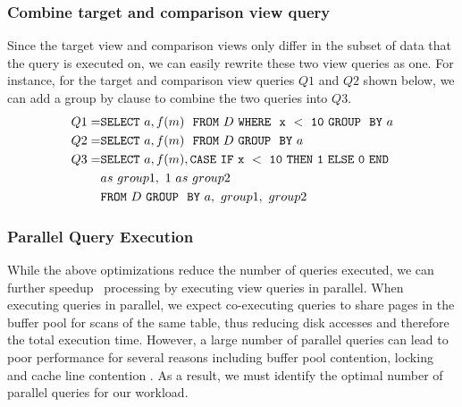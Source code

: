 \subsubsection{Combine target and comparison view query}
\label{subsec:target_comparison_view}
Since the target view and comparison views only differ in the subset of data
that the query is executed on, we can easily rewrite these two view queries as
one. For instance, for the target and comparison view queries $Q1$ and $Q2$
shown below, we can add a group by clause to combine the two queries into $Q3$.
\begin{align*} 
Q1 = &{\tt SELECT \ } a, f(m) \ \ {\tt FROM} \  D\  {\tt WHERE \ \ x\ <\ 10\
GROUP \ \ BY} \ a \\
Q2 = &{\tt SELECT \ } a, f(m) \ \ {\tt FROM} \  D\  {\tt GROUP \ \ BY} \ a \\
Q3 = &{\tt SELECT \ } a, f(m), {\tt CASE\ IF\ x\ <\ 10\ THEN\ 1\ ELSE\ 0\
END}\\ 
&as\ group1,\ 1\ as\ group2\\ 
&{\tt FROM} \ D\ {\tt GROUP \ \ BY} \ a,\ group1,\ group2
\end{align*}

  \subsubsection {Parallel Query Execution}
  \label{subsec:parallel_exec}
  While the above optimizations reduce the number of queries executed, we can
  further speedup \VizRecDB\ processing by executing view queries in parallel. When
  executing queries in parallel, we expect co-executing queries to share pages in the
  buffer pool for scans of the same table, thus reducing disk accesses and
  therefore the total execution time. 
  However, a large number of parallel queries can lead to poor performance for
  several reasons including buffer pool contention, locking and cache line
  contention \cite{Postgres_wiki}. 
  As a result, we must identify the optimal number of parallel queries for our workload.
  
